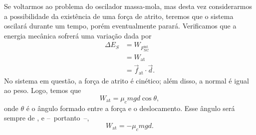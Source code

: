 Se voltarmos ao problema do oscilador massa-mola, mas desta vez considerarmos a possibilidade da existência de uma força de atrito, teremos que o sistema oscilará durante um tempo, porém eventualmente parará. Verificamos que a energia mecânica sofrerá uma variação dada por
\begin{align}
    \Delta E_S &= W_{F_{\textrm{NC}}^{\textrm{int}}} \\
    &= W_{\textrm{at}} \\
    &= \vec{f}_{\textrm{at}} \cdot \vec{d}.
\end{align}
%
No sistema em questão, a força de atrito é cinético; além disso, a normal é igual ao peso. Logo, temos que
\begin{equation}
    W_{\textrm{at}} = \mu_c m g d \cos \theta,
\end{equation}
%
onde $\theta$ é o ângulo formado entre a força e o deslocamento. Esse ângulo será sempre de , e --~portanto~--,
\begin{equation}
    W_{\textrm{at}} = - \mu_c m g d.
\end{equation}

